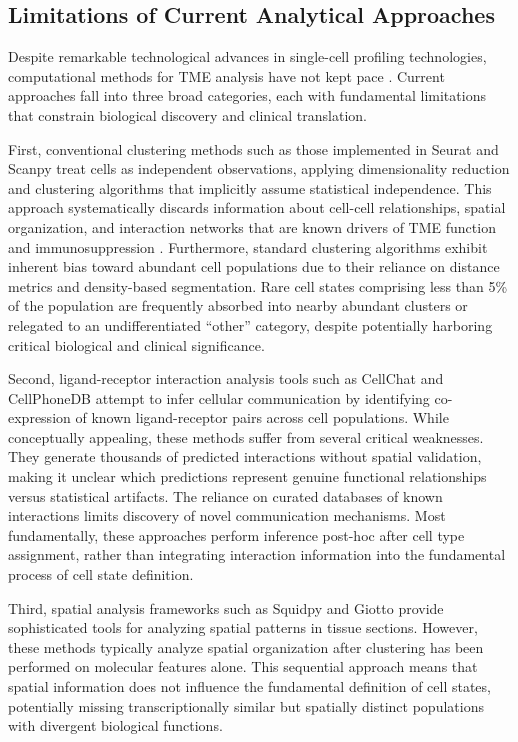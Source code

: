 \documentclass{article}
\begin{document}
\subsection{Limitations of Current Analytical Approaches}

Despite remarkable technological advances in single-cell profiling technologies, computational methods for TME analysis have not kept pace \citep{stuart2019integrative}. Current approaches fall into three broad categories, each with fundamental limitations that constrain biological discovery and clinical translation.

First, conventional clustering methods such as those implemented in Seurat \citep{hao2021integrated} and Scanpy \citep{wolf2018scanpy} treat cells as independent observations, applying dimensionality reduction and clustering algorithms that implicitly assume statistical independence. This approach systematically discards information about cell-cell relationships, spatial organization, and interaction networks that are known drivers of TME function and immunosuppression \citep{palla2022squidpy}. Furthermore, standard clustering algorithms exhibit inherent bias toward abundant cell populations due to their reliance on distance metrics and density-based segmentation. Rare cell states comprising less than 5\% of the population are frequently absorbed into nearby abundant clusters or relegated to an undifferentiated ``other'' category, despite potentially harboring critical biological and clinical significance.

Second, ligand-receptor interaction analysis tools such as CellChat \citep{jin2021inference} and CellPhoneDB \citep{efremova2020cellphonedb} attempt to infer cellular communication by identifying co-expression of known ligand-receptor pairs across cell populations. While conceptually appealing, these methods suffer from several critical weaknesses. They generate thousands of predicted interactions without spatial validation, making it unclear which predictions represent genuine functional relationships versus statistical artifacts. The reliance on curated databases of known interactions limits discovery of novel communication mechanisms. Most fundamentally, these approaches perform inference post-hoc after cell type assignment, rather than integrating interaction information into the fundamental process of cell state definition.

Third, spatial analysis frameworks such as Squidpy \citep{palla2022squidpy} and Giotto \citep{dries2021giotto} provide sophisticated tools for analyzing spatial patterns in tissue sections. However, these methods typically analyze spatial organization after clustering has been performed on molecular features alone. This sequential approach means that spatial information does not influence the fundamental definition of cell states, potentially missing transcriptionally similar but spatially distinct populations with divergent biological functions.
\end{document}
